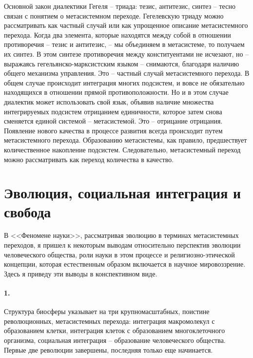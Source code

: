 \documentclass{book}
\begin{document}
Основной закон диалектики Гегеля -- триада: тезис, антитезис, синтез -- тесно связан с понятием о метасистемном переходе. Гегелевскую триаду можно рассматривать как частный случай или как упрощенное описание метасистемного перехода. Когда два элемента, которые находятся между собой в отношении противоречия -- тезис и антитезис, -- мы объединяем в метасистеме, то получаем их синтез. В этом синтезе противоречия между конституентами не исчезают, но -- выражаясь гегельянско-марксистским языком -- снимаются, благодаря наличию общего механизма управления. Это -- частный случай метасистемного перехода. В общем случае происходит интег­рация многих подсистем, и вовсе не обязательно находящихся в отношении прямой противоположности. Но и в этом случае диалектик может использовать свой язык, объявив наличие множества  интегрируемых подсистем отрицанием единичности, которое затем снова сменяется единой системой -- метасистемой. Это -- отрицание отрицания. Появление нового качества в процессе развития всегда происходит 
путем метасистемного перехода. Образованию метасистемы, как правило, предшествует количественное накопление подсистем. Следовательно, метасистемный переход можно рассматривать как переход количества в качество.


\section{Эволюция, социальная интеграция и свобода}

В <<Феномене науки>>, рассматривая эволюцию в терминах метасистемных переходов, я пришел к некоторым выводам относительно перспектив эволюции человеческого общества, роли науки в этом процессе и религиозно-этической концепции, которая естественным образом включается в научное ми­ровоззрение. Здесь я приведу эти выводы в конспективном виде.

\paragraph{1.} Структура биосферы указывает на три крупномасштабных, поистине революционных, метасистемных перехода: интеграция макромолекул с образованием клетки, интеграция клеток с образованием многоклеточного организма, социальная интеграция -- образование человеческого общества. Первые две революции завершены, последняя только еще начинается.
\end{document}
